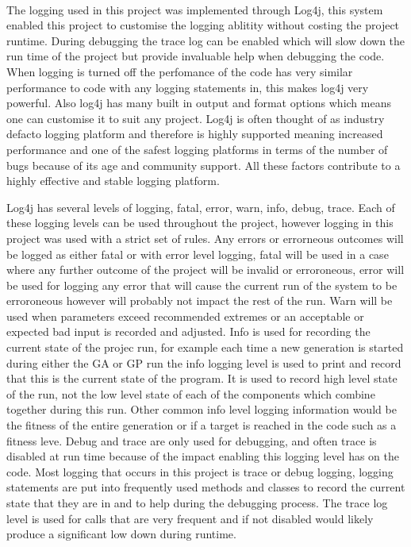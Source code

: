 \documentclass[10pt,twocolumn]{article}
\begin{document}
\paragraph{}

The logging used in this project was implemented through Log4j, this system enabled this project to customise the logging 
ablitity without costing the project runtime. During debugging the trace log can be enabled which will slow down the
run time of the project but provide invaluable help when debugging the code. When logging is turned off the perfomance
of the code has very similar performance to code with any logging statements in, this makes log4j very powerful. Also
log4j has many built in output and format options which means one can customise it to suit any project. Log4j is often
thought of as industry defacto logging platform and therefore is highly supported meaning increased performance
and one of the safest logging platforms in terms of the number of bugs because of its age and community support. All these
factors contribute to a highly effective and stable logging platform. 

Log4j has several levels of logging, fatal, error, warn, info, debug, trace. Each of these logging levels can be used throughout
the project, however logging in this project was used with a strict set of rules. Any errors or errorneous outcomes will 
be logged as either fatal or with error level logging, fatal will be used in a case where any further outcome of the project
will be invalid or erroroneous, error will be used for logging any error that will cause the current run of the system to be
erroroneous however will probably not impact the rest of the run. Warn will be used when parameters exceed recommended
extremes or an acceptable or expected bad input is recorded and adjusted. Info is used for recording the current state of
the projec run, for example each time a new generation is started during either the GA or GP run the info logging level is
used to print and record that this is the current state of the program. It is used to record high level state of the run,
not the low level state of each of the components which combine together during this run. Other common info level logging
information would be the fitness of the entire generation or if a target is reached in the code such as a fitness leve.
Debug and trace are only used for debugging, and often trace is disabled at run time because of the impact enabling this
logging level has on the code. Most logging that occurs in this project is trace or debug logging, logging statements are
put into frequently used methods and classes to record the current state that they are in and to help during the debugging
process. The trace log level is used for calls that are very frequent and if not disabled would likely produce a significant
low down during runtime. 
\end{document}
